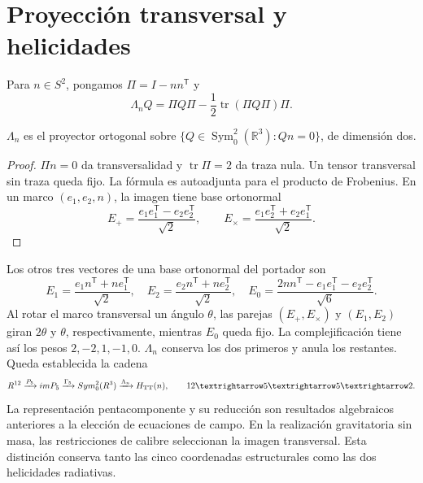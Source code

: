 \section{Proyección transversal y helicidades}
Para \(n\in S^2\), pongamos \(\Pi=I-nn^{\mathsf T}\) y
\[
 \Lambda_nQ=\Pi Q\Pi-\frac12\operatorname{tr}(\Pi Q\Pi)\Pi.
\]
\begin{proposition}
\(\Lambda_n\) es el proyector ortogonal sobre
\(\{Q\in\operatorname{Sym}^2_0(\mathbb R^3):Qn=0\}\), de dimensión dos.
\end{proposition}
\begin{proof}
\(\Pi n=0\) da transversalidad y \(\operatorname{tr}\Pi=2\) da
traza nula. Un tensor transversal sin traza queda fijo.
La fórmula es autoadjunta para el producto de Frobenius.
En un marco \((e_1,e_2,n)\), la imagen tiene base ortonormal
\[
 E_+=\frac{e_1e_1^{\mathsf T}-e_2e_2^{\mathsf T}}{\sqrt2},\qquad
 E_\times=\frac{e_1e_2^{\mathsf T}+e_2e_1^{\mathsf T}}{\sqrt2}.
\]
\end{proof}
Los otros tres vectores de una base ortonormal del portador son
\[
 E_1=\frac{e_1n^{\mathsf T}+ne_1^{\mathsf T}}{\sqrt2},\quad
 E_2=\frac{e_2n^{\mathsf T}+ne_2^{\mathsf T}}{\sqrt2},\quad
 E_0=\frac{2nn^{\mathsf T}-e_1e_1^{\mathsf T}-e_2e_2^{\mathsf T}}{\sqrt6}.
\]
Al rotar el marco transversal un ángulo \(\theta\), las parejas
\((E_+,E_\times)\) y \((E_1,E_2)\) giran \(2\theta\) y
\(\theta\), respectivamente, mientras \(E_0\) queda fijo. La
complejificación tiene así los pesos \(2,-2,1,-1,0\).
\(\Lambda_n\) conserva los dos primeros y anula los restantes.
Queda establecida la cadena
\[
 \mathbb R^{12}\xrightarrow{P_5}\operatorname{im}P_5
 \xrightarrow{\Gamma_5}\operatorname{Sym}^2_0(\mathbb R^3)
 \xrightarrow{\Lambda_n}\mathcal H_{\rm TT}(n),
 \qquad 12\longrightarrow5\longrightarrow5\longrightarrow2.
\]
La representación pentacomponente y su reducción son resultados
algebraicos anteriores a la elección de ecuaciones de campo.
En la realización gravitatoria sin masa, las restricciones de calibre
seleccionan la imagen transversal. Esta distinción conserva tanto las
cinco coordenadas estructurales como las dos helicidades radiativas.





